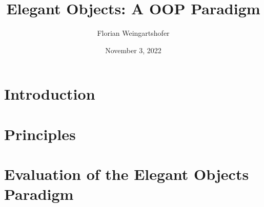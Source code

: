 \documentclass[10pt,journal]{IEEEtran}
\title{Elegant Objects: A OOP Paradigm}
\author{Florian Weingartshofer}
\date{November 3, 2022}
\begin{document}
    \maketitle



    \section{Introduction}\label{sec:introduction}


    \section{Principles}\label{sec:principles}
    

    \section{Evaluation of the Elegant Objects Paradigm}\label{sec:evaluation-of-the-elegant-objects-paradigm}
    

    
    
\end{document}
